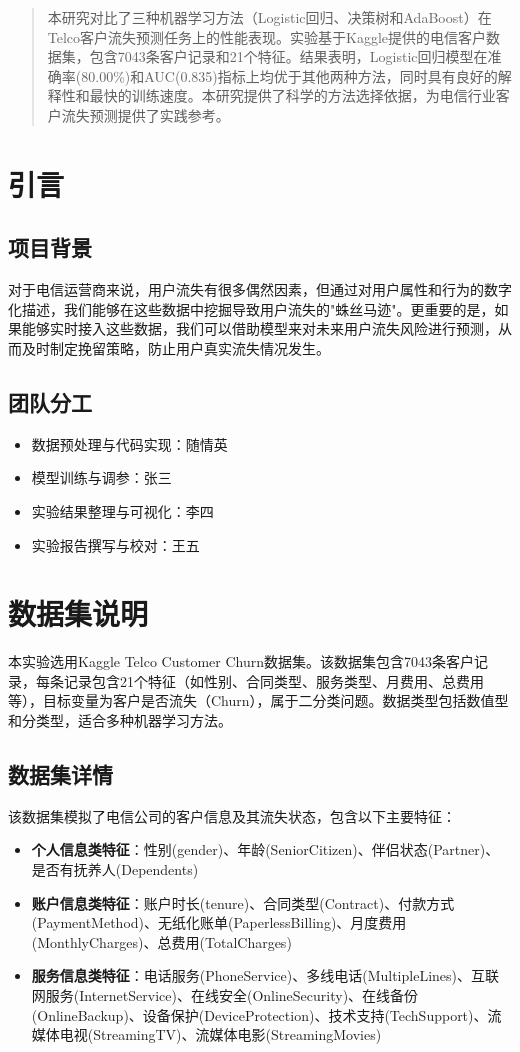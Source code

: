 \documentclass{article}
\begin{document}
\begin{abstract}
本研究对比了三种机器学习方法（Logistic回归、决策树和AdaBoost）在Telco客户流失预测任务上的性能表现。实验基于Kaggle提供的电信客户数据集，包含7043条客户记录和21个特征。结果表明，Logistic回归模型在准确率(80.00\%)和AUC(0.835)指标上均优于其他两种方法，同时具有良好的解释性和最快的训练速度。本研究提供了科学的方法选择依据，为电信行业客户流失预测提供了实践参考。
\end{abstract}

\section{引言}

\subsection{项目背景}
对于电信运营商来说，用户流失有很多偶然因素，但通过对用户属性和行为的数字化描述，我们能够在这些数据中挖掘导致用户流失的"蛛丝马迹"。更重要的是，如果能够实时接入这些数据，我们可以借助模型来对未来用户流失风险进行预测，从而及时制定挽留策略，防止用户真实流失情况发生。

\subsection{团队分工}
\begin{itemize}
    \item 数据预处理与代码实现：随情英
    \item 模型训练与调参：张三
    \item 实验结果整理与可视化：李四
    \item 实验报告撰写与校对：王五
\end{itemize}

\section{数据集说明}
本实验选用Kaggle Telco Customer Churn数据集。该数据集包含7043条客户记录，每条记录包含21个特征（如性别、合同类型、服务类型、月费用、总费用等），目标变量为客户是否流失（Churn），属于二分类问题。数据类型包括数值型和分类型，适合多种机器学习方法。

\subsection{数据集详情}
该数据集模拟了电信公司的客户信息及其流失状态，包含以下主要特征：
\begin{itemize}
    \item \textbf{个人信息类特征}：性别(gender)、年龄(SeniorCitizen)、伴侣状态(Partner)、是否有抚养人(Dependents)
    \item \textbf{账户信息类特征}：账户时长(tenure)、合同类型(Contract)、付款方式(PaymentMethod)、无纸化账单(PaperlessBilling)、月度费用(MonthlyCharges)、总费用(TotalCharges)
    \item \textbf{服务信息类特征}：电话服务(PhoneService)、多线电话(MultipleLines)、互联网服务(InternetService)、在线安全(OnlineSecurity)、在线备份(OnlineBackup)、设备保护(DeviceProtection)、技术支持(TechSupport)、流媒体电视(StreamingTV)、流媒体电影(StreamingMovies)
\end{itemize}
\end{document}
